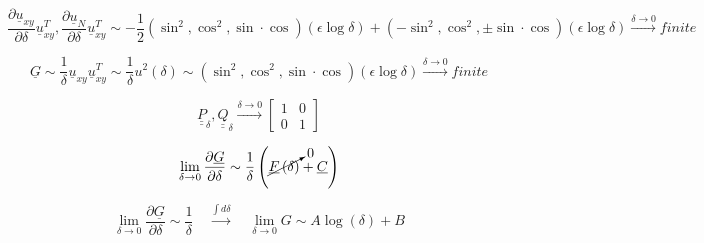 \documentclass[a4paper]{jpconf}
\begin{document}
\begin{equation}
\frac{\partial \underline{u}_{xy}}{\partial \delta}\underline{u}_{xy}^{T},\frac{\partial \underline{u}_{N}}{\partial \delta}\underline{u}_{xy}^{T}\sim -\frac{1}{2}\left(\sin^{2},\cos^{2},\sin\cdot\cos\right)\left(\epsilon\log{\delta}\right)+\left(-\sin^{2},\cos^{2},\pm\sin\cdot\cos\right)\left(\epsilon\log{\delta}\right)\xrightarrow{\delta\rightarrow 0}finite
\end{equation}

\begin{equation}
\underline{G}\sim\frac{1}{\delta}\underline{u}_{xy}\underline{u}_{xy}^{T}\sim \frac{1}{\delta}u^{2}\left(\delta\right)\sim\left(\sin^{2},\cos^{2},\sin\cdot\cos\right)\left(\epsilon\log{\delta}\right)\xrightarrow{\delta\rightarrow 0}finite
\end{equation}

\begin{equation}
\underline{\underline{P}}_{\delta},\underline{\underline{Q}}_{\delta}\xrightarrow{\delta\rightarrow 0}\begin{bmatrix}1&0\\0&1\end{bmatrix}
\end{equation}

\begin{equation}
\lim_{\delta\rightarrow 0}\frac{\partial \underline{G}}{\partial \delta}\sim\frac{1}{\delta}\left(\cancelto{0}{\underline{F}\left(\delta\right)}+\underline{C}\right)
\end{equation}

\begin{equation}
\lim_{\delta\rightarrow 0}\frac{\partial \underline{G}}{\partial \delta}\sim\frac{1}{\delta}\quad\xrightarrow{\int d\delta}\quad\lim_{\delta\rightarrow 0}G\sim A\log(\delta)+B
\end{equation}
\end{document}

